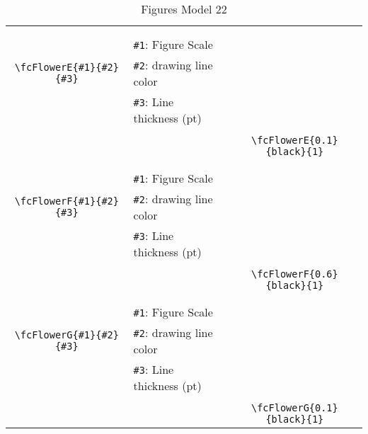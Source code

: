 \documentclass[x11names]{article}
\begin{document}
\begin{table}[H]
\begin{tabular}{|c|l|c|}
	&&\multirow{5}{*}{\fcFlowerE{0.1}{black}{1}}\\	&&\\	&\verb|#1|: Figure Scale &\\	\verb|\fcFlowerE{#1}{#2}{#3}|&	\verb|#2|: drawing line color &\\	&\verb|#3|: Line thickness (pt) &\\ &&\\&&	\verb|\fcFlowerE{0.1}{black}{1}|\\\hline 	
	&&\multirow{5}{*}{\fcFlowerF{0.6}{black}{1}}\\	&&\\	&\verb|#1|: Figure Scale &\\	\verb|\fcFlowerF{#1}{#2}{#3}|&	\verb|#2|: drawing line color &\\	&\verb|#3|: Line thickness (pt) &\\ &&\\&&	\verb|\fcFlowerF{0.6}{black}{1}|\\\hline 	
	&&\multirow{5}{*}{\fcFlowerG{0.1}{black}{1}}\\	&&\\	&\verb|#1|: Figure Scale &\\	\verb|\fcFlowerG{#1}{#2}{#3}|&	\verb|#2|: drawing line color &\\	&\verb|#3|: Line thickness (pt) &\\ &&\\&&	\verb|\fcFlowerG{0.1}{black}{1}|\\\hline 	\hline\end{tabular}\caption{Figures Model 22}\label{tab22}\end{table}
\end{document}
